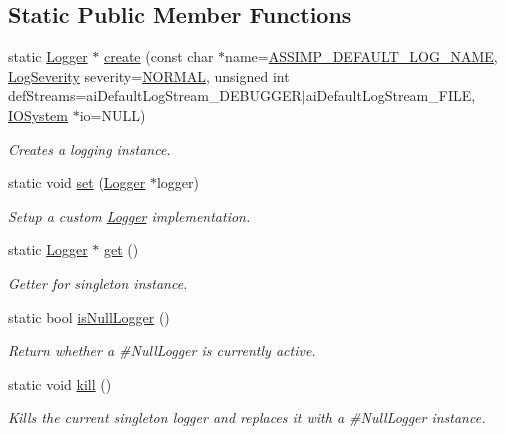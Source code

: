 \subsection*{Static Public Member Functions}
\begin{DoxyCompactItemize}
\item 
static \hyperlink{class_assimp_1_1_logger}{Logger} $\ast$ \hyperlink{class_assimp_1_1_default_logger_adccb11f85f8b0ef226c382e11ba665c3}{create} (const char $\ast$name=\hyperlink{_default_logger_8h_a5e31e6d6c9f8a8954134f3da38fec0a0}{A\-S\-S\-I\-M\-P\-\_\-\-D\-E\-F\-A\-U\-L\-T\-\_\-\-L\-O\-G\-\_\-\-N\-A\-M\-E}, \hyperlink{class_assimp_1_1_logger_a8b6248a0fd062431e8572556350d29e6}{Log\-Severity} severity=\hyperlink{class_assimp_1_1_logger_a8b6248a0fd062431e8572556350d29e6a79d16f85dc21486ee489f300027e8eda}{N\-O\-R\-M\-A\-L}, unsigned int def\-Streams=ai\-Default\-Log\-Stream\-\_\-\-D\-E\-B\-U\-G\-G\-E\-R$\vert$ai\-Default\-Log\-Stream\-\_\-\-F\-I\-L\-E, \hyperlink{class_assimp_1_1_i_o_system}{I\-O\-System} $\ast$io=N\-U\-L\-L)
\begin{DoxyCompactList}\small\item\em Creates a logging instance. \end{DoxyCompactList}\item 
static void \hyperlink{class_assimp_1_1_default_logger_a9daba548026045b99813c760c2842ed2}{set} (\hyperlink{class_assimp_1_1_logger}{Logger} $\ast$logger)
\begin{DoxyCompactList}\small\item\em Setup a custom \hyperlink{class_assimp_1_1_logger_a784e6d1a741072b17bab32a6a41055e8}{Logger} implementation. \end{DoxyCompactList}\item 
static \hyperlink{class_assimp_1_1_logger}{Logger} $\ast$ \hyperlink{class_assimp_1_1_default_logger_a7d0a53f2db66945ade30094330a77ba4}{get} ()
\begin{DoxyCompactList}\small\item\em Getter for singleton instance. \end{DoxyCompactList}\item 
static bool \hyperlink{class_assimp_1_1_default_logger_abebc7ee702a2a2dde765e771948400c6}{is\-Null\-Logger} ()
\begin{DoxyCompactList}\small\item\em Return whether a \#\-Null\-Logger is currently active. \end{DoxyCompactList}\item 
\hypertarget{class_assimp_1_1_default_logger_a0b1da096d7442af5a4a4cb5ebb2540f7}{static void \hyperlink{class_assimp_1_1_default_logger_a0b1da096d7442af5a4a4cb5ebb2540f7}{kill} ()}\label{class_assimp_1_1_default_logger_a0b1da096d7442af5a4a4cb5ebb2540f7}

\begin{DoxyCompactList}\small\item\em Kills the current singleton logger and replaces it with a \#\-Null\-Logger instance. \end{DoxyCompactList}\end{DoxyCompactItemize}
